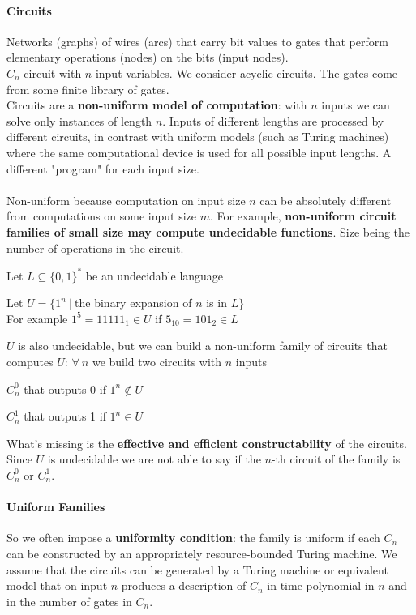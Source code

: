 \documentclass[10pt]{report}
\begin{document}
\paragraph{Circuits} Networks (graphs) of wires (arcs) that carry bit values to gates that perform elementary operations (nodes) on the bits (input nodes).\\
$C_n$ circuit with $n$ input variables. We consider acyclic circuits. The gates come from some finite library of gates.\\
Circuits are a \textbf{non-uniform model of computation}: with $n$ inputs we can solve only instances of length $n$. Inputs of different lengths are processed by different circuits, in contrast with uniform models (such as Turing machines) where the same computational device is used for all possible input lengths. A different "program" for each input size.\\\\Non-uniform because computation on input size $n$ can be absolutely different from computations on some input size $m$. For example, \textbf{non-uniform circuit families of small size may compute undecidable functions}. Size being the number of operations in the circuit.\begin{list}{}{}
	\item Let $L\subseteq \{0,1\}^*$ be an undecidable language
	\item Let $U = \{1^n\:|\:$the binary expansion of $n$ is in $L\}$\\
	For example $1^5 = 11111_1\in U$ if $5_{10}=101_2 \in L$
	\item $U$ is also undecidable, but we can build a non-uniform family of circuits that computes $U$: $\forall\:n$ we build two circuits with $n$ inputs\begin{list}{}{}
		\item $C_n^0$ that outputs 0 if $1^n\not\in U$
		\item $C_n^1$ that outputs 1 if $1^n\in U$
	\end{list}
	What's missing is the \textbf{effective and efficient constructability} of the circuits. Since $U$ is undecidable we are not able to say if the $n$-th circuit of the family is $C_n^0$ or $C_n^1$.
\end{list}
\paragraph{Uniform Families} So we often impose a \textbf{uniformity condition}: the family is uniform if each $C_n$ can be constructed by an appropriately resource-bounded Turing machine. We assume that the circuits can be generated by a Turing machine or equivalent model that on input $n$ produces a description of $C_n$ in time polynomial in $n$ and in the number of gates in $C_n$.
\end{document}
